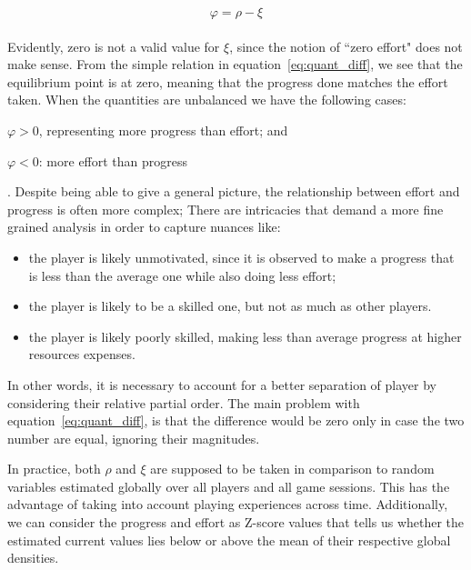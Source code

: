\begin{equation}\label{eq:quant_diff}
    \varphi = \rho - \xi
\end{equation}\\

Evidently, zero is not a valid value for $\xi$, since the notion of ``zero effort" does not make sense. %
From the simple relation in equation~\ref{eq:quant_diff}, we see that the equilibrium point is at zero, meaning that the progress done matches the effort taken. When the quantities are unbalanced we have the following cases:~\begin{enumerate*}[label=\alph*)]\item $\varphi > 0$, representing more progress than effort; and \item $\varphi < 0$: more effort than progress\end{enumerate*}. Despite being able to give a general picture, the relationship between effort and progress is often more complex; There are intricacies that demand a more fine grained analysis in order to capture nuances like: 
\begin{itemize}
    \item the player is likely unmotivated, since it is observed to make a progress that is less than the average one while also doing less effort;
    \item the player is likely to be a skilled one, but not as much as other players. %
    \item the player is likely poorly skilled, making less than average progress at higher resources expenses. %
\end{itemize}

In other words, it is necessary to account for a better separation of player by considering their relative partial order. The main problem with equation~\ref{eq:quant_diff}, is that the difference would be zero only in case the two number are equal, ignoring their magnitudes.

In practice, both $\rho$ and $\xi$ are supposed to be taken in comparison to random variables estimated globally over all players and all game sessions. This has the advantage of taking into account playing experiences across time. Additionally, we can consider the progress and effort as Z-score values that tells us whether the estimated current values lies below or above the mean of their respective global densities. 

